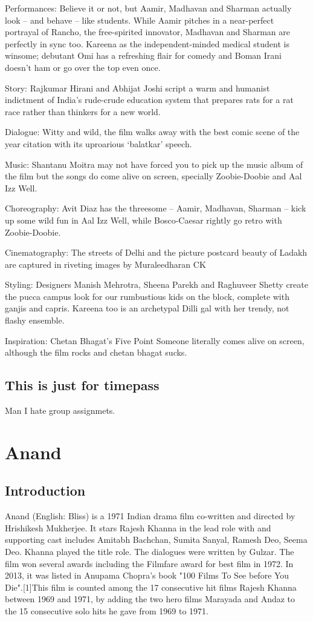 \documentclass[11pt]{article}
\begin{document}
Performances: Believe it or not, but Aamir, Madhavan and Sharman actually look -- and behave -- like students. While Aamir pitches in a near-perfect portrayal of Rancho, the free-spirited innovator, Madhavan and Sharman are perfectly in sync too. Kareena as the independent-minded medical student is winsome; debutant Omi has a refreshing flair for comedy and Boman Irani doesn't ham or go over the top even once.

Story: Rajkumar Hirani and Abhijat Joshi script a warm and humanist indictment of India's rude-crude education system that prepares rats for a rat race rather than thinkers for a new world.

Dialogue: Witty and wild, the film walks away with the best comic scene of the year citation with its uproarious `balatkar' speech.

Music: Shantanu Moitra may not have forced you to pick up the music album of the film but the songs do come alive on screen, specially Zoobie-Doobie and Aal Izz Well.

Choreography: Avit Diaz has the threesome -- Aamir, Madhavan, Sharman -- kick up some wild fun in Aal Izz Well, while Bosco-Caesar rightly go retro with Zoobie-Doobie.

Cinematography: The streets of Delhi and the picture postcard beauty of Ladakh are captured in riveting images by Muraleedharan CK

Styling: Designers Manish Mehrotra, Sheena Parekh and Raghuveer Shetty create the pucca campus look for our rumbustious kids on the block, complete with ganjis and capris. Kareena too is an archetypal Dilli gal with her trendy, not flashy ensemble.

Inspiration: Chetan Bhagat's Five Point Someone literally comes alive on screen, although the film rocks and chetan bhagat sucks.
\subsection{This is just for timepass}
Man I hate group assignmets.
\section*{Anand}
\subsection*{Introduction}
Anand (English: Bliss) is a 1971 Indian drama film co-written and directed by Hrishikesh Mukherjee.
It stars Rajesh Khanna in the lead role with and supporting cast includes Amitabh Bachchan, Sumita Sanyal, 
Ramesh Deo, Seema Deo. Khanna played the title role. The dialogues were written by Gulzar. The film won 
several awards including the Filmfare award for best film in 1972. In 2013, it was listed in Anupama Chopra's
book "100 Films To See before You Die".[1]This film is counted among the 17 consecutive hit films Rajesh Khanna
between 1969 and 1971, by adding the two hero films Marayada and Andaz to the 15 consecutive solo hits he gave 
from 1969 to 1971.
\end{document}
